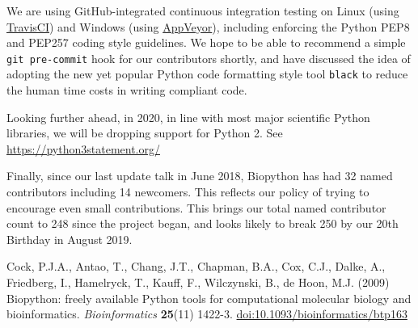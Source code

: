 \documentclass[10pt,oneside]{article}
\begin{document}
We are using GitHub-integrated continuous integration testing on Linux (using
\href{https://travis-ci.org/biopython/biopython/builds}{TravisCI}) and Windows
(using \href{https://ci.appveyor.com/project/biopython/biopython/history}{AppVeyor}),
including enforcing the Python PEP8 and PEP257 coding style guidelines.
We hope to be able to recommend a simple \texttt{git pre-commit} hook
for our contributors shortly, and have discussed the idea of adopting the
new yet popular Python code formatting style tool \texttt{black} to reduce
the human time costs in writing compliant code.

Looking further ahead, in 2020, in line with most major scientific Python
libraries, we will be dropping support for Python 2. See \url{https://python3statement.org/}

Finally, since our last update talk in June 2018, Biopython has had 32 named
contributors including 14 newcomers. This reflects our policy of trying to
encourage even small contributions. This brings our total named contributor
count to 248 since the project began, and looks likely to break 250 by our
20th Birthday in August 2019.

\begin{thebibliography}{}

Cock, P.J.A., Antao, T., Chang, J.T., Chapman, B.A., Cox, C.J., Dalke, A., Friedberg, I., Hamelryck, T., Kauff, F., Wilczynski, B., de Hoon, M.J. (2009) Biopython: freely available Python tools for computational molecular biology and bioinformatics. {\it Bioinformatics} {\bf 25}(11) 1422-3. \href{http://dx.doi.org/10.1093/bioinformatics/btp163}{doi:10.1093/bioinformatics/btp163}

\end{thebibliography}
\end{document}
